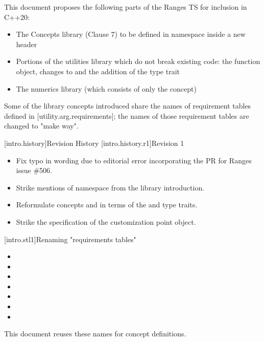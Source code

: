 This document proposes the following parts of the Ranges TS for inclusion in C++20:
\begin{itemize}
\item The Concepts library (Clause 7) to be defined in namespace  inside
  a new  header
\item Portions of the utilities library which do not break existing code: the
   function object, changes to   and the
  addition of the  type trait
\item The numerics library (which consists of only the
   concept)
\end{itemize}
Some of the library concepts introduced share the names of requirement tables
defined in [utility.arg.requirements]; the names of those requirement tables are
changed to "make way".

[intro.history]{Revision History}
[intro.history.r1]{Revision 1}
\begin{itemize}
\item Fix typo in  wording due to editorial error
  incorporating the PR for Ranges issue \#506.
\item Strike mentions of namespace  from the library introduction.
\item Reformulate concepts  and  in terms
  of the  and  type traits.
\item Strike the specification of the  customization point object.
\end{itemize}

[intro.stl1]{Renaming "requirements tables"}

\pnum
{}
\begin{itemize}
\item {}
\item {}
\item {}
\item {}
\item {}
\item {}
\item {}
\end{itemize}
This document reuses these names for concept definitions.

